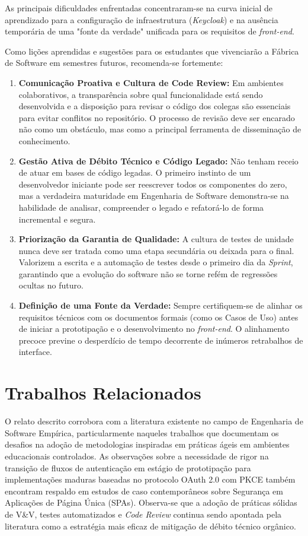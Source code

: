 As principais dificuldades enfrentadas concentraram-se na curva inicial de aprendizado para a configuração de infraestrutura (\textit{Keycloak}) e na ausência temporária de uma "fonte da verdade" unificada para os requisitos de \textit{front-end}. 

Como lições aprendidas e sugestões para os estudantes que vivenciarão a Fábrica de Software em semestres futuros, recomenda-se fortemente:
\begin{enumerate}
    \item \textbf{Comunicação Proativa e Cultura de Code Review:} Em ambientes colaborativos, a transparência sobre qual funcionalidade está sendo desenvolvida e a disposição para revisar o código dos colegas são essenciais para evitar conflitos no repositório. O processo de revisão deve ser encarado não como um obstáculo, mas como a principal ferramenta de disseminação de conhecimento.
    \item \textbf{Gestão Ativa de Débito Técnico e Código Legado:} Não tenham receio de atuar em bases de código legadas. O primeiro instinto de um desenvolvedor iniciante pode ser reescrever todos os componentes do zero, mas a verdadeira maturidade em Engenharia de Software demonstra-se na habilidade de analisar, compreender o legado e refatorá-lo de forma incremental e segura.
    \item \textbf{Priorização da Garantia de Qualidade:} A cultura de testes de unidade nunca deve ser tratada como uma etapa secundária ou deixada para o final. Valorizem a escrita e a automação de testes desde o primeiro dia da \textit{Sprint}, garantindo que a evolução do software não se torne refém de regressões ocultas no futuro.
    \item \textbf{Definição de uma Fonte da Verdade:} Sempre certifiquem-se de alinhar os requisitos técnicos com os documentos formais (como os Casos de Uso) antes de iniciar a prototipação e o desenvolvimento no \textit{front-end}. O alinhamento precoce previne o desperdício de tempo decorrente de inúmeros retrabalhos de interface.
\end{enumerate}

\section{Trabalhos Relacionados}

O relato descrito corrobora com a literatura existente no campo de Engenharia de Software Empírica, particularmente naqueles trabalhos que documentam os desafios na adoção de metodologias inspiradas em práticas ágeis em ambientes educacionais controlados. As observações sobre a necessidade de rigor na transição de fluxos de autenticação em estágio de prototipação para implementações maduras baseadas no protocolo OAuth 2.0 com PKCE também encontram respaldo em estudos de caso contemporâneos sobre Segurança em Aplicações de Página Única (SPAs). Observa-se que a adoção de práticas sólidas de V\&V, testes automatizados e \textit{Code Review} continua sendo apontada pela literatura como a estratégia mais eficaz de mitigação de débito técnico orgânico.

